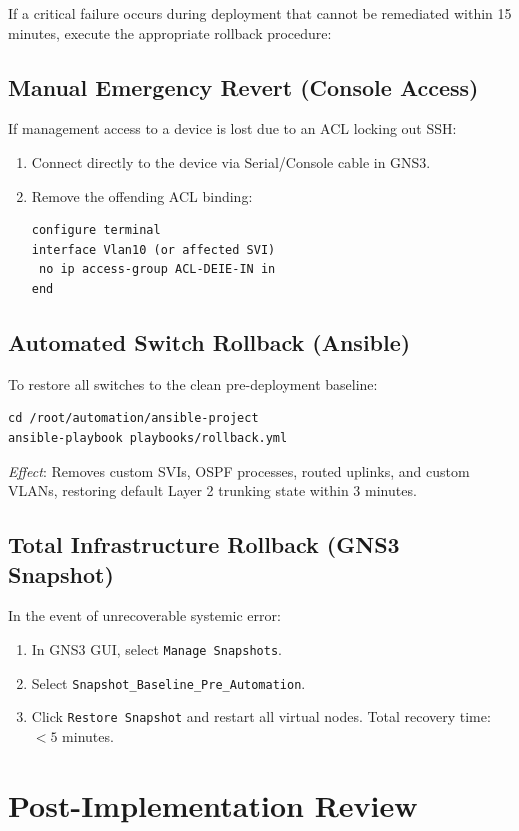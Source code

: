 \documentclass[11pt,a4paper]{article}
\newcommand{\hr}{\vspace{0.2cm}\noindent\hrulefill\vspace{0.2cm}}
\begin{document}
If a critical failure occurs during deployment that cannot be remediated within 15 minutes, execute the appropriate rollback procedure:

\subsection{Manual Emergency Revert (Console Access)}
If management access to a device is lost due to an ACL locking out SSH:
\begin{enumerate}
    \item Connect directly to the device via Serial/Console cable in GNS3.
    \item Remove the offending ACL binding:
\begin{lstlisting}[style=ciscostyle]
configure terminal
interface Vlan10 (or affected SVI)
 no ip access-group ACL-DEIE-IN in
end
\end{lstlisting}
\end{enumerate}

\subsection{Automated Switch Rollback (Ansible)}
To restore all switches to the clean pre-deployment baseline:
\begin{lstlisting}[style=bashstyle]
cd /root/automation/ansible-project
ansible-playbook playbooks/rollback.yml
\end{lstlisting}
\textit{Effect}: Removes custom SVIs, OSPF processes, routed uplinks, and custom VLANs, restoring default Layer 2 trunking state within 3 minutes.

\subsection{Total Infrastructure Rollback (GNS3 Snapshot)}
In the event of unrecoverable systemic error:
\begin{enumerate}
    \item In GNS3 GUI, select \texttt{Manage Snapshots}.
    \item Select \texttt{Snapshot\_Baseline\_Pre\_Automation}.
    \item Click \texttt{Restore Snapshot} and restart all virtual nodes. Total recovery time: $< 5$ minutes.
\end{enumerate}

\hr

\section{Post-Implementation Review}
\end{document}
